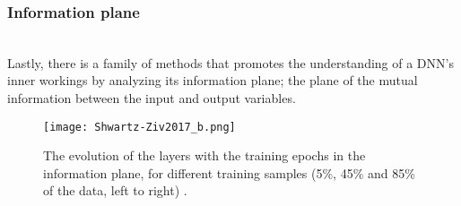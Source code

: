 \documentclass[journal]{IEEEtran}
\begin{document}
\subsubsection{Information plane}
\hfill\\
Lastly, there is a family of methods that promotes the understanding of a DNN's inner workings by analyzing its information plane; the plane of the mutual information between the input and output variables.

\begin{figure}
  \texttt{[image: Shwartz-Ziv2017\_b.png]}
  \caption{The evolution of the layers with the training epochs in the information plane, for different training samples (5\%,  45\% and 85\% of the data, left to right) \cite{Shwartz-Ziv2017}.}
\end{figure}
\end{document}
